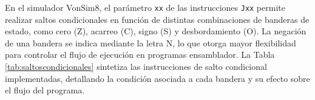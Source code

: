 \documentclass[12pt,oneside]{templates/unerthesis}
\begin{document}
\begin{table}[!h]
\centering
\caption{\label{tab:setreducido}Tabla de instrucciones de VonSim8}
\centering
{}
\end{table}

En el simulador VonSim8, el parámetro \texttt{xx} de las instrucciones \texttt{Jxx} permite realizar saltos condicionales en función de distintas combinaciones de banderas de estado, como cero (Z), acarreo (C), signo (S) y desbordamiento (O). La negación de una bandera se indica mediante la letra N, lo que otorga mayor flexibilidad para controlar el flujo de ejecución en programas ensamblador. La Tabla \ref{tab:saltoscondicionales} sintetiza las instrucciones de salto condicional implementadas, detallando la condición asociada a cada bandera y su efecto sobre el flujo del programa.
\end{document}
